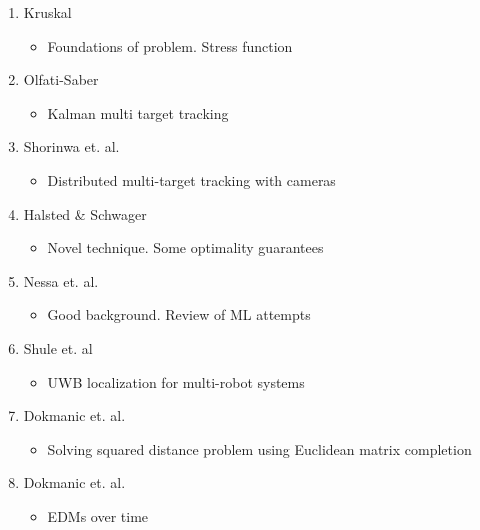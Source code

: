 \documentclass{IEEEtran}
\begin{document}
\begin{enumerate}
    \item Kruskal \cite{Kruskal1964}
    \begin{itemize}
        \item Foundations of problem. Stress function 
    \end{itemize}
    \item Olfati-Saber \cite{kalman_distributed}
    \begin{itemize}
        \item Kalman multi target tracking 
    \end{itemize}
    \item Shorinwa et. al. \cite{distributed_multitarget_tracking}
    \begin{itemize}
        \item Distributed multi-target tracking with cameras 
    \end{itemize}
    
    \item Halsted \& Schwager \cite{R_elevator}
    \begin{itemize}
        \item Novel technique. Some optimality guarantees 
    \end{itemize}

    \item Nessa et. al. \cite{ML_positioning_survey}
    \begin{itemize}
        \item Good background. Review of ML attempts 
    \end{itemize}

    \item Shule et. al 
    \begin{itemize}
        \item UWB localization for multi-robot systems 
    \end{itemize}

    \item Dokmanic et. al. 
    \begin{itemize}
        \item Solving squared distance problem using Euclidean matrix completion
    \end{itemize} 

    \item Dokmanic et. al.
    \begin{itemize}
        \item EDMs over time
    \end{itemize}
\end{enumerate}
\end{document}
